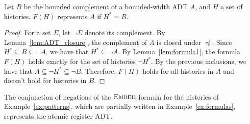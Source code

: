 \begin{lemma}
  \label{lem:formula2}

  Let $B$ be the bounded complement of a bounded-width ADT $A$, and $H$
  a set of histories. $F(H)$ represents $A$ if $H^* = B$.

\end{lemma}

\begin{proof}

  For a set $\Sigma$, let $\neg \Sigma$ denote its complement. By
  Lemma~\ref{lem:ADT_closure}, the complement of $A$ is closed under $\preceq$.
  Since $H^* \subseteq B\subseteq \neg A$, we have that
  $H^* \subseteq \neg A$. By Lemma~\ref{lem:formula1}, the formula $F(H)$ holds
  exactly for the set of histories $\neg H^*$. By the previous inclusions, we
  have that $A\subseteq \neg H^* \subseteq \neg B$. Therefore, $F(H)$ holds for
  all histories in $A$ and doesn't hold for histories in $B$.
\end{proof}

\begin{example}

  The conjunction of negations of the $\textsc{Embed}$ formula for the
  histories of Example~\ref{ex:patterns}, which are partially written in
  Example~\ref{ex:formulas}, represents the atomic register ADT.

\end{example}

%
%
%
